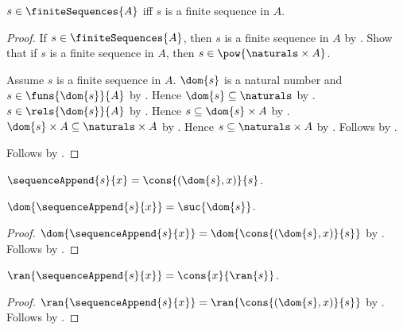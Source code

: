 \begin{proposition}\label{finite_sequences_iff}
    $s\in\finiteSequences{A}$ iff $s$ is a finite sequence in $A$.
\end{proposition}
\begin{proof}
    If $s\in\finiteSequences{A}$, then $s$ is a finite sequence in $A$
        by .
    Show that if $s$ is a finite sequence in $A$, then
        $s\in\pow{\naturals\times A}$.
    \begin{subproof}
        Assume $s$ is a finite sequence in $A$.
        $\dom{s}$ is a natural number and
            $s\in\funs{\dom{s}}{A}$ by .
        Hence $\dom{s}\subseteq\naturals$
            by .
        $s\in\rels{\dom{s}}{A}$ by .
        Hence $s\subseteq\dom{s}\times A$ by .
        $\dom{s}\times A\subseteq\naturals\times A$
            by .
        Hence $s\subseteq\naturals\times A$ by .
        Follows by .
    \end{subproof}
    Follows by .
\end{proof}

\begin{definition}\label{sequence_append}
    $\sequenceAppend{s}{x}=\cons{(\dom{s},x)}{s}$.
\end{definition}

\begin{proposition}\label{sequence_append_domain}
    $\dom{\sequenceAppend{s}{x}}=\suc{\dom{s}}$.
\end{proposition}
\begin{proof}
    $\dom{\sequenceAppend{s}{x}}
        =\dom{\cons{(\dom{s},x)}{s}}$ by .
    Follows by .
\end{proof}

\begin{proposition}\label{sequence_append_range}
    $\ran{\sequenceAppend{s}{x}}=\cons{x}{\ran{s}}$.
\end{proposition}
\begin{proof}
    $\ran{\sequenceAppend{s}{x}}
        =\ran{\cons{(\dom{s},x)}{s}}$ by .
    Follows by .
\end{proof}

